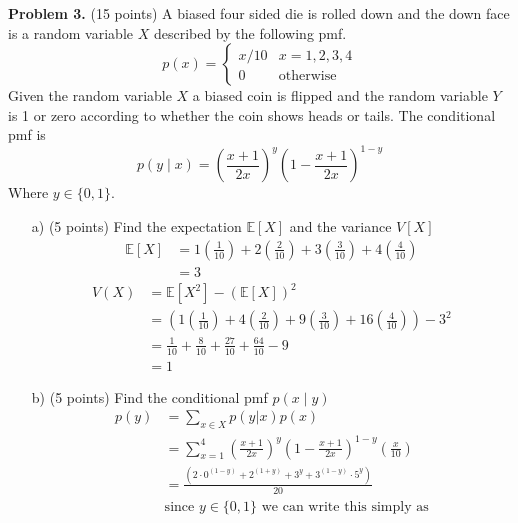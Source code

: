 \documentclass[a4 paper]{article}
\begin{document}
	\textbf{Problem 3.} (15 points) A biased four sided die is rolled down and the down face is a random variable $X$ described by the following pmf.
	\begin{equation*}
	p(x) = \begin{cases} 
	x/10 & x=1,2,3,4 \\
	0 & \text{otherwise}
	\end{cases}
	\end{equation*}
	Given the random variable $X$ a biased coin is flipped and the random variable $Y$ is 1 or zero according to whether the coin shows heads or tails. The conditional pmf is 
	\begin{equation*}
		p(y \mid x) = \left(\frac{x+1}{2x}\right)^y\left(1 - \frac{x+1}{2x}\right)^{1-y}
	\end{equation*}
	Where $ y \in \{0, 1\}$.
	\begin{enumerate}
		\item[a) (5 points)] Find the expectation $\mathbb{E}[X]$ and the variance $V[X]$
		\begin{equation*}
			\begin{split}
				\mathbb{E}[X] & = 1(\frac{1}{10}) + 2(\frac{2}{10}) + 3(\frac{3}{10}) + 4(\frac{4}{10})\\
				& = 3
			\end{split}
		\end{equation*}
		\begin{equation*}
			\begin{split}
				V(X) & = \mathbb{E}[X^2] - (\mathbb{E}[X])^2  \\
				& = (1(\frac{1}{10})+4(\frac{2}{10})+9(\frac{3}{10})+16(\frac{4}{10})) - 3^2 \\
				& =  \frac{1}{10} + \frac{8}{10} + \frac{27}{10} + \frac{64}{10} - 9 \\
				& = 1
			\end{split}
		\end{equation*}
		\item[b) (5 points)] Find the conditional pmf $p(x\mid y)$
		\begin{equation*}
			\begin{split}
			p(y) & = \sum_{x\in X} p(y|x)p(x) \\
			& = \sum_{x=1}^4\left( \frac{x+1}{2x}\right)^y\left(1 - \frac{x+1}{2x} \right)^{1-y}\left(\frac{x}{10}\right)\\
			& = \frac{(2 \cdot 0^{(1 - y)} + 2^{(1 + y)} + 3^y + 3^{(1 - y)}\cdot 5^y)}{20}\\
			&\text{since } y \in \{0, 1\} \text{ we can write this simply as} \\

\end{split}
\end{equation*}
\end{enumerate}
\end{document}
